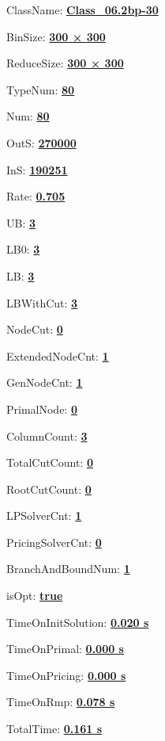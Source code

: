 \documentclass[11pt]{article}
\begin{document}
\pagestyle{empty}


ClassName: \underline{\textbf{Class_06.2bp-30}}
\par
BinSize: \underline{\textbf{300 × 300}}
\par
ReduceSize: \underline{\textbf{300 × 300}}
\par
TypeNum: \underline{\textbf{80}}
\par
Num: \underline{\textbf{80}}
\par
OutS: \underline{\textbf{270000}}
\par
InS: \underline{\textbf{190251}}
\par
Rate: \underline{\textbf{0.705}}
\par
UB: \underline{\textbf{3}}
\par
LB0: \underline{\textbf{3}}
\par
LB: \underline{\textbf{3}}
\par
LBWithCut: \underline{\textbf{3}}
\par
NodeCut: \underline{\textbf{0}}
\par
ExtendedNodeCnt: \underline{\textbf{1}}
\par
GenNodeCnt: \underline{\textbf{1}}
\par
PrimalNode: \underline{\textbf{0}}
\par
ColumnCount: \underline{\textbf{3}}
\par
TotalCutCount: \underline{\textbf{0}}
\par
RootCutCount: \underline{\textbf{0}}
\par
LPSolverCnt: \underline{\textbf{1}}
\par
PricingSolverCnt: \underline{\textbf{0}}
\par
BranchAndBoundNum: \underline{\textbf{1}}
\par
isOpt: \underline{\textbf{true}}
\par
TimeOnInitSolution: \underline{\textbf{0.020 s}}
\par
TimeOnPrimal: \underline{\textbf{0.000 s}}
\par
TimeOnPricing: \underline{\textbf{0.000 s}}
\par
TimeOnRmp: \underline{\textbf{0.078 s}}
\par
TotalTime: \underline{\textbf{0.161 s}}
\par
\newpage
\end{document}
